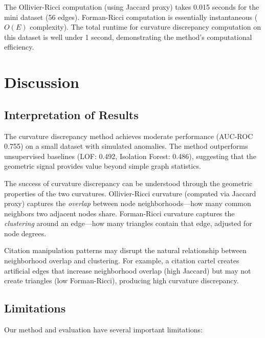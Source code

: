 \documentclass[11pt,letterpaper]{article}
\begin{document}
The Ollivier-Ricci computation (using Jaccard proxy) takes 0.015 seconds for the mini dataset (56 edges). Forman-Ricci computation is essentially instantaneous ($O(E)$ complexity). The total runtime for curvature discrepancy computation on this dataset is well under 1 second, demonstrating the method's computational efficiency.

\section{Discussion}

\subsection{Interpretation of Results}

The curvature discrepancy method achieves moderate performance (AUC-ROC 0.755) on a small dataset with simulated anomalies. The method outperforms unsupervised baselines (LOF: 0.492, Isolation Forest: 0.486), suggesting that the geometric signal provides value beyond simple graph statistics.

The success of curvature discrepancy can be understood through the geometric properties of the two curvatures. Ollivier-Ricci curvature (computed via Jaccard proxy) captures the \textit{overlap} between node neighborhoods---how many common neighbors two adjacent nodes share. Forman-Ricci curvature captures the \textit{clustering} around an edge---how many triangles contain that edge, adjusted for node degrees.

Citation manipulation patterns may disrupt the natural relationship between neighborhood overlap and clustering. For example, a citation cartel creates artificial edges that increase neighborhood overlap (high Jaccard) but may not create triangles (low Forman-Ricci), producing high curvature discrepancy.

\subsection{Limitations}

Our method and evaluation have several important limitations:
\end{document}
